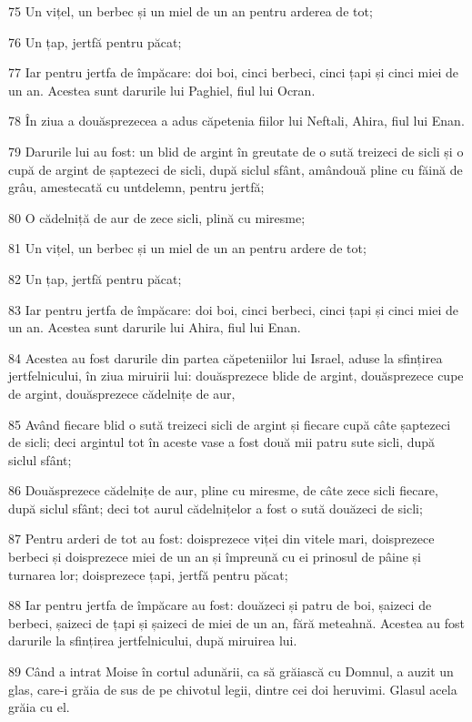 \par 75 Un vițel, un berbec și un miel de un an pentru arderea de tot;
\par 76 Un țap, jertfă pentru păcat;
\par 77 Iar pentru jertfa de împăcare: doi boi, cinci berbeci, cinci țapi și cinci miei de un an. Acestea sunt darurile lui Paghiel, fiul lui Ocran.
\par 78 În ziua a douăsprezecea a adus căpetenia fiilor lui Neftali, Ahira, fiul lui Enan.
\par 79 Darurile lui au fost: un blid de argint în greutate de o sută treizeci de sicli și o cupă de argint de șaptezeci de sicli, după siclul sfânt, amândouă pline cu făină de grâu, amestecată cu untdelemn, pentru jertfă;
\par 80 O cădelniță de aur de zece sicli, plină cu miresme;
\par 81 Un vițel, un berbec și un miel de un an pentru ardere de tot;
\par 82 Un țap, jertfă pentru păcat;
\par 83 Iar pentru jertfa de împăcare: doi boi, cinci berbeci, cinci țapi și cinci miei de un an. Acestea sunt darurile lui Ahira, fiul lui Enan.
\par 84 Acestea au fost darurile din partea căpeteniilor lui Israel, aduse la sfințirea jertfelnicului, în ziua miruirii lui: douăsprezece blide de argint, douăsprezece cupe de argint, douăsprezece cădelnițe de aur,
\par 85 Având fiecare blid o sută treizeci sicli de argint și fiecare cupă câte șaptezeci de sicli; deci argintul tot în aceste vase a fost două mii patru sute sicli, după siclul sfânt;
\par 86 Douăsprezece cădelnițe de aur, pline cu miresme, de câte zece sicli fiecare, după siclul sfânt; deci tot aurul cădelnițelor a fost o sută douăzeci de sicli;
\par 87 Pentru arderi de tot au fost: doisprezece viței din vitele mari, doisprezece berbeci și doisprezece miei de un an și împreună cu ei prinosul de pâine și turnarea lor; doisprezece țapi, jertfă pentru păcat;
\par 88 Iar pentru jertfa de împăcare au fost: douăzeci și patru de boi, șaizeci de berbeci, șaizeci de țapi și șaizeci de miei de un an, fără meteahnă. Acestea au fost darurile la sfințirea jertfelnicului, după miruirea lui.
\par 89 Când a intrat Moise în cortul adunării, ca să grăiască cu Domnul, a auzit un glas, care-i grăia de sus de pe chivotul legii, dintre cei doi heruvimi. Glasul acela grăia cu el.

